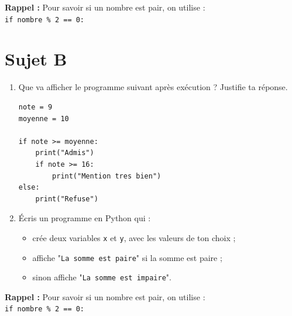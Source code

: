 \documentclass[12pt,a4paper]{article}
\begin{document}
\vspace{0.3cm}
\textbf{Rappel :} Pour savoir si un nombre est pair, on utilise :\\
\texttt{if nombre \% 2 == 0:}

\newpage

\section*{Sujet B}

\begin{enumerate}
    \item Que va afficher le programme suivant après exécution ? Justifie ta réponse.

\begin{lstlisting}
note = 9
moyenne = 10

if note >= moyenne:
    print("Admis")
    if note >= 16:
        print("Mention tres bien")
else:
    print("Refuse")
\end{lstlisting}

\begin{tcolorbox}[colframe=black, colback=white, width=\linewidth]
\vspace{3.5cm}
\end{tcolorbox}

    \item Écris un programme en Python qui :
    \begin{itemize}
        \item crée deux variables \texttt{x} et \texttt{y}, avec les valeurs de ton choix ;
        \item affiche "\texttt{La somme est paire}" si la somme est paire ;
        \item sinon affiche "\texttt{La somme est impaire}".
    \end{itemize}

\begin{tcolorbox}[colframe=black, colback=white, width=\linewidth]
\vspace{5cm}
\end{tcolorbox}

\end{enumerate}

\vspace{0.3cm}
\textbf{Rappel :} Pour savoir si un nombre est pair, on utilise :\\
\texttt{if nombre \% 2 == 0:}

\end{document}
